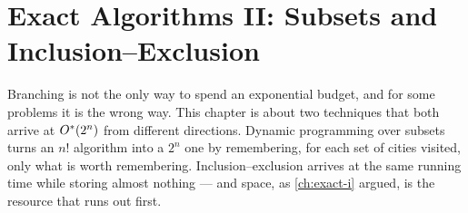 
\chapter[Exact Algorithms II: Inclusion--Exclusion]{Exact Algorithms II:
Subsets and Inclusion--Exclusion}
\label{ch:exact-ii}

Branching is not the only way to spend an exponential budget, and for some
problems it is the wrong way. This chapter is about two techniques that both
arrive at $O^{*}(2^n)$ from different directions. Dynamic programming over
subsets turns an $n!$ algorithm into a $2^n$ one by remembering, for each set of
cities visited, only what is worth remembering. Inclusion--exclusion arrives at
the same running time while storing almost nothing --- and space, as
\cref{ch:exact-i} argued, is the resource that runs out first.

\begin{goals}
\end{goals}

